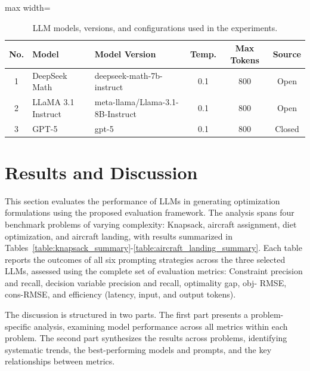 \documentclass[review,12pt]{elsarticle}
\begin{document}
\begin{table}[H]
\centering
\caption{LLM models, versions, and configurations used in the experiments.}
\label{table:model_details}
\renewcommand{\arraystretch}{0.9} %
\setlength{\tabcolsep}{4pt}      %
\scriptsize                      %

\begin{adjustbox}{max width=\linewidth}
\begin{tabular}{c l l c c c}
\toprule
\textbf{No.} & \textbf{Model} & \textbf{Model Version} & \textbf{Temp.} & \textbf{Max Tokens} & \textbf{Source} \\
\midrule
1 & DeepSeek Math & deepseek-math-7b-instruct & 0.1 & 800 & Open \\
2 & LLaMA 3.1 Instruct & meta-llama/Llama-3.1-8B-Instruct & 0.1 & 800 & Open \\
3 & GPT-5 & gpt-5 & 0.1 & 800 & Closed \\
\bottomrule
\end{tabular}
\end{adjustbox}
\end{table}


\vspace{-8mm}
\section{Results and Discussion}\label{sec:discution}
    This section evaluates the performance of LLMs in generating optimization formulations using the proposed evaluation framework. The analysis spans four benchmark problems of varying complexity: Knapsack, aircraft assignment, diet optimization, and aircraft landing, with results summarized in Tables~\ref{table:knapsack_summary}-\ref{table:aircraft_landing_summary}. Each table reports the outcomes of all six prompting strategies across the three selected LLMs, assessed using the complete set of evaluation metrics: Constraint precision and recall, decision variable precision and recall, optimality gap, obj- RMSE, cons-RMSE, and efficiency (latency, input, and output tokens). 

    The discussion is structured in two parts. The first part presents a problem-specific analysis, examining model performance across all metrics within each problem. The second part synthesizes the results across problems, identifying systematic trends, the best-performing models and prompts, and the key relationships between metrics.
\end{document}
